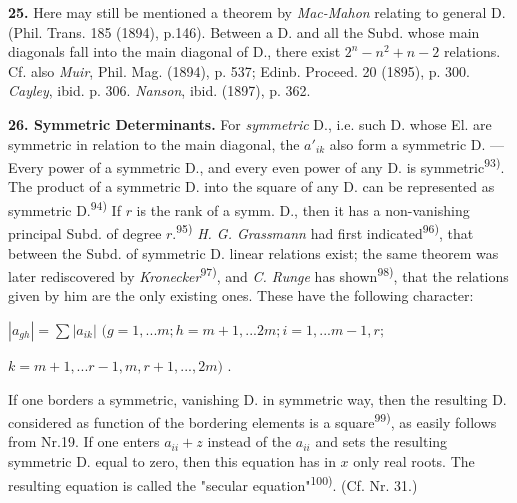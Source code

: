 \thispagestyle{fancy}

\vspace{0.5cm}

\textbf{25.} Here may still be mentioned a theorem by \textit{Mac-Mahon} relating to general D. (Phil. Trans. 185 (1894), p.146). Between a D. and all the Subd. whose main diagonals fall into the main diagonal of D., there exist $2^n-n^2+n-2$ relations. Cf. also \textit{Muir}, Phil. Mag. (1894), p. 537; Edinb. Proceed. 20 (1895), p. 300. \textit{Cayley}, ibid. p. 306. \textit{Nanson}, ibid. (1897), p. 362.

\vspace{0.2cm}

\textbf{26. Symmetric Determinants.} For \textit{symmetric} D., i.e. such D. whose El. are symmetric in relation to the main diagonal, the $a'_{ik}$ also form a symmetric D. — Every power of a symmetric D., and every even power of any D. is symmetric\textsuperscript{93)}. The product of a symmetric D. into the square of any D. can be represented as symmetric D.\textsuperscript{94)} If $r$ is the rank of a symm. D., then it has a non-vanishing principal Subd. of degree $r$.\textsuperscript{95)} \textit{H. G. Grassmann} had first indicated\textsuperscript{96)}, that between the Subd. of symmetric D. linear relations exist; the same theorem was later rediscovered by \textit{Kronecker}\textsuperscript{97)}, and \textit{C. Runge} has shown\textsuperscript{98)}, that the relations given by him are the only existing ones. These have the following character:

\vspace{-0.1cm}
\begin{center}
    $|a_{gh}| = \sum |a_{ik}|$ \quad $(g=1,...m; h=m+1,...2m; i=1,...m-1,r;$
    
    \quad \quad \quad \quad $k=m+1,...r-1,m,r+1,...,2m)$ .
    
\end{center}
\vspace{-0.1cm}

If one borders a symmetric, vanishing D. in symmetric way, then the resulting D. considered as function of the bordering elements is a square\textsuperscript{99)}, as easily follows from Nr.19. If one enters $a_{ii}+z$ instead of the $a_{ii}$ and sets the resulting symmetric D. equal to zero, then this equation has in $x$ only real roots. The resulting equation is called the "secular equation"\textsuperscript{100)}. (Cf. Nr. 31.)


